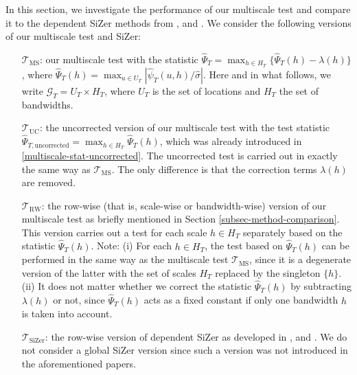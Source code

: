 In this section, we investigate the performance of our multiscale test and compare it to the dependent SiZer methods from \cite{Rondonotti2004}, \cite{Rondonotti2007} and \cite{ParkHannigKang2009}. We consider the following versions of our multiscale test and SiZer:
\begin{itemize}[leftmargin=1.25cm]

\item[$\mathcal{T}_{\text{MS}}$:] our multiscale test with the statistic $\widehat{\Psi}_T = \max_{h \in H_T} \{ \widehat{\Psi}_T(h) - \lambda(h) \}$, where $\widehat{\Psi}_T(h) = \max_{u \in U_T} |\widehat{\psi}_T(u,h) / \widehat{\sigma}|$. Here and in what follows, we write $\mathcal{G}_T = U_T \times H_T$, where $U_T$ is the set of locations and $H_T$ the set of bandwidths.  

\item[$\mathcal{T}_{\text{UC}}$:] the uncorrected version of our multiscale test with the test statistic $\widehat{\Psi}_{T,\text{uncorrected}} = \max_{h \in H_T} \widehat{\Psi}_T(h)$, which was already introduced in \eqref{multiscale-stat-uncorrected}. The uncorrected test is carried out in exactly the same way as $\mathcal{T}_{\text{MS}}$. The only difference is that the correction terms $\lambda(h)$ are removed. 

\item[$\mathcal{T}_{\text{RW}}$:] the row-wise (that is, scale-wise or bandwidth-wise) version of our multiscale test as briefly mentioned in Section \ref{subsec-method-comparison}. This version carries out a test for each scale $h \in H_T$ separately based on the statistic $\widehat{\Psi}_T(h)$. Note: (i) For each $h \in H_T$, the test based on $\widehat{\Psi}_T(h)$ can be performed in the same way as the multiscale test $\mathcal{T}_{\text{MS}}$, since it is a degenerate version of the latter with the set of scales $H_T$ replaced by the singleton $\{h\}$. (ii) It does not matter whether we correct the statistic $\widehat{\Psi}_T(h)$ by subtracting $\lambda(h)$ or not, since $\widehat{\Psi}_T(h)$ acts as a fixed constant if only one bandwidth $h$ is taken into account. 

\item[$\mathcal{T}_{\text{SiZer}}$:] the row-wise version of dependent SiZer as developed in \cite{Rondonotti2004}, \cite{Rondonotti2007} and \cite{ParkHannigKang2009}. We do not consider a global SiZer version since such a version was not introduced in the aforementioned papers. 

\end{itemize}


